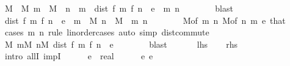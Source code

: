\begin{isabellebody}
\ M\ \ M{\isacharcolon}{\kern0pt}\ {\isachardoublequoteopen}m\ {\isasymge}\ M\ {\isasymLongrightarrow}\ n\ {\isachargreater}{\kern0pt}\ m\ {\isasymLongrightarrow}\ dist\ {\isacharparenleft}{\kern0pt}f\ m{\isacharparenright}{\kern0pt}\ {\isacharparenleft}{\kern0pt}f\ n{\isacharparenright}{\kern0pt}\ {\isacharless}{\kern0pt}\ e{\isachardoublequoteclose}\ \ m\ n\isanewline
\ \ \ \ \ \ \isamarkupfalse%
\ blast\isanewline
\ \ \ \ \isamarkupfalse%
\ {\isachardoublequoteopen}dist\ {\isacharparenleft}{\kern0pt}f\ m{\isacharparenright}{\kern0pt}\ {\isacharparenleft}{\kern0pt}f\ n{\isacharparenright}{\kern0pt}\ {\isacharless}{\kern0pt}\ e{\isachardoublequoteclose}\ \ {\isachardoublequoteopen}m\ {\isasymge}\ M{\isachardoublequoteclose}\ {\isachardoublequoteopen}n\ {\isasymge}\ M{\isachardoublequoteclose}\ \ m\ n\isanewline
\ \ \ \ \ \ \isamarkupfalse%
\ M{\isacharbrackleft}{\kern0pt}of\ m\ n{\isacharbrackright}{\kern0pt}\ M{\isacharbrackleft}{\kern0pt}of\ n\ m{\isacharbrackright}{\kern0pt}\ e\ that\ \isamarkupfalse%
\ {\isacharparenleft}{\kern0pt}cases\ m\ n\ rule{\isacharcolon}{\kern0pt}\ linorder{\isacharunderscore}{\kern0pt}cases{\isacharparenright}{\kern0pt}\ {\isacharparenleft}{\kern0pt}auto\ simp{\isacharcolon}{\kern0pt}\ dist{\isacharunderscore}{\kern0pt}commute{\isacharparenright}{\kern0pt}\isanewline
\ \ \ \ \isamarkupfalse%
\ \isamarkupfalse%
\ {\isachardoublequoteopen}{\isasymexists}M{\isachardot}{\kern0pt}\ {\isasymforall}m{\isasymge}M{\isachardot}{\kern0pt}\ {\isasymforall}n{\isasymge}M{\isachardot}{\kern0pt}\ dist\ {\isacharparenleft}{\kern0pt}f\ m{\isacharparenright}{\kern0pt}\ {\isacharparenleft}{\kern0pt}f\ n{\isacharparenright}{\kern0pt}\ {\isacharless}{\kern0pt}\ e{\isachardoublequoteclose}\isanewline
\ \ \ \ \ \ \isamarkupfalse%
\ blast\isanewline
\ \ \isamarkupfalse%
\isanewline
{}\isamarkupfalse%
\isanewline
\ \ \isamarkupfalse%
\ {\isacharquery}{\kern0pt}lhs\isanewline
\ \ \isamarkupfalse%
\ {\isacharquery}{\kern0pt}rhs\isanewline
\ \ \isamarkupfalse%
\ {\isacharparenleft}{\kern0pt}intro\ allI\ impI{\isacharparenright}{\kern0pt}\isanewline
\ \ \ \ \isamarkupfalse%
\ e\ {\isacharcolon}{\kern0pt}{\isacharcolon}{\kern0pt}\ real\isanewline
\ \ \ \ \isamarkupfalse%
\ e{\isacharcolon}{\kern0pt}\ {\isachardoublequoteopen}e\ {\isachargreater}{\kern0pt}\ {}{\isachardoublequoteclose}\isanewline

\end{isabellebody}
